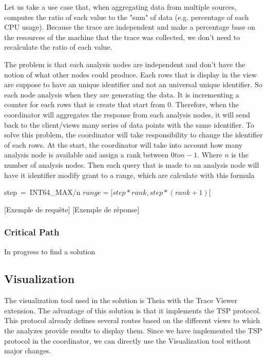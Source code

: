 Let us take a use case that, when aggregating data from multiple sources, computes the ratio of each value to the "sum" of data (e.g. percentage of each CPU usage). Because the trace are independent and make a percentage base on the resources of the machine that the trace was collected, we don't need to recalculate the ratio of each value. 

The problem is that each analysis nodes are independent and don't have the notion of what other nodes could produce. Each rows that is display in the view are suppose to have an unique identifier and not an universal unique identifier. So each node analysis when they are generating the data. It is incrementing a counter for each rows that is create that start from 0. Therefore, when the coordinator will aggregates the response from each analysis nodes, it will send back to the client/views many series of data points with the same identifier. To solve this problem, the coordinator will take responsibility to change the identifier of each rows. At the start, the coordinator will take into account how many analysis node is available and assign a rank between $0 to n-1$. Where $n$ is the number of analysis nodes. Then each query that is made to an analysis node will have it identifier modify grant to a range, which are calculate with this formula 

\hbox{step = INT64\_MAX/n}
$ range = [step * rank, step * (rank + 1)[$ 


[Exemple de requête]
[Exemple de réponse]
\subsubsection{Critical Path}

In progress to find a solution

\subsection{Visualization}

The visualization tool used in the solution is Theia with the Trace Viewer extension. The advantage of this solution is that it implements the TSP protocol. This protocol already defines several routes based on the different views to which the analyzes provide results to display them. Since we have implemented the TSP protocol in the coordinator, we can directly use the Visualization tool without major changes.

